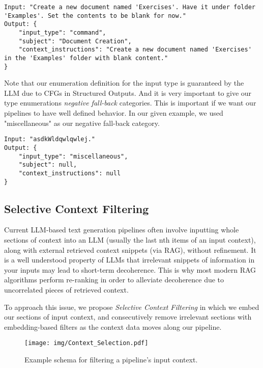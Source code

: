 \begin{lstlisting}[frame=single, caption={Semantic Decomposition of a command prompt, along with decomposed context instructions.}]
Input: "Create a new document named 'Exercises'. Have it under folder 'Examples'. Set the contents to be blank for now."
Output: {
    "input_type": "command",
    "subject": "Document Creation",
    "context_instructions": "Create a new document named 'Exercises' in the 'Examples' folder with blank content."
}
\end{lstlisting}

Note that our enumeration definition for the input type is guaranteed by the LLM due to CFGs in Structured Outputs. And it is very important to give our type enumerations \textit{negative fall-back} categories. This is important if we want our pipelines to have well defined behavior. In our given example, we used "miscellaneous" as our negative 
fall-back category. 

\begin{lstlisting}[frame=single, caption=Semantic Decomposition of a nonsensical prompt.]
Input: "asdkWldqwlqwlej."
Output: {
    "input_type": "miscellaneous",
    "subject": null,
    "context_instructions": null
}
\end{lstlisting}

\subsection{Selective Context Filtering}

Current LLM-based text generation pipelines often involve inputting whole sections of context into an LLM (usually the last nth items of an input context), along with external retrieved context snippets (via RAG), without refinement. It is a well understood property of LLMs that irrelevant snippets of information in your inputs may lead to short-term decoherence. This is why most modern RAG algorithms perform re-ranking in order to alleviate decoherence due to uncorrelated pieces of retrieved context.

To approach this issue, we propose \textit{Selective Context Filtering} in which we embed our sections of input context, and consecutively remove irrelevant sections with embedding-based filters as the context data moves along our pipeline. 

\begin{figure}[h]
\centering
\texttt{[image: img/Context\_Selection.pdf]}
\caption{Example schema for filtering a pipeline's input context.}
\end{figure}


